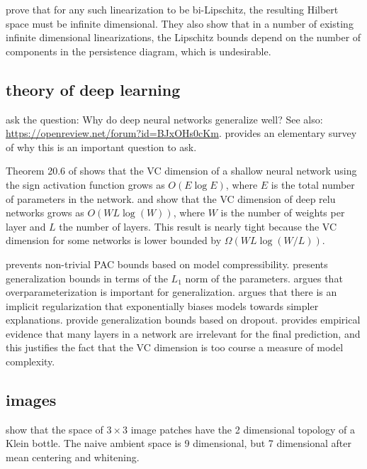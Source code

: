 \documentclass{article}
\begin{document}
\citet{carriere2018metric} prove that for any such linearization to be bi-Lipschitz, 
the resulting Hilbert space must be infinite dimensional.
They also show that in a number of existing infinite dimensional linearizations,
the Lipschitz bounds depend on the number of components in the persistence diagram,
which is undesirable.

\subsection{theory of deep learning}

\citet{zhang2016understanding,neyshabur2017exploring} ask the question: 
Why do deep neural networks generalize well?
See also: \url{https://openreview.net/forum?id=BJxOHs0cKm}.
\citet{jakubovitz2018generalization} provides an elementary survey of why this is an important question to ask.

Theorem 20.6 of \citet{shalev2014understanding} shows that the VC dimension of a shallow neural network using the sign activation function grows as $O(E\log E)$, 
where $E$ is the total number of parameters in the network.
\citet{bartlett2017nearly} and \citet{harvey2017nearly} show that the VC dimension of deep relu networks grows as $O(WL\log(W))$,
where $W$ is the number of weights per layer and $L$ the number of layers.
This result is nearly tight because the VC dimension for some networks is lower bounded by $\Omega(WL\log(W/L))$.

\citet{zhou2018compressibility} prevents non-trivial PAC bounds based on model compressibility.
\citet{barron2018approximation} presents generalization bounds in terms of the $L_1$ norm of the parameters.
\citet{neyshabur2018role} argues that overparameterization is important for generalization.
\citet{perez2018deep} argues that there is an implicit regularization that exponentially biases models towards simpler explanations.
\citet{mou2018dropout} provide generalization bounds based on dropout.
\citet{zhang2019all} provides empirical evidence that many layers in a network are irrelevant for the final prediction,
and this justifies the fact that the VC dimension is too course a measure of model complexity.

\subsection{images}

\citet{carlsson2008local} show that the space of $3\times3$ image patches have the 2 dimensional topology of a Klein bottle.
The naive ambient space is 9 dimensional,
but 7 dimensional after mean centering and whitening.


\end{document}
